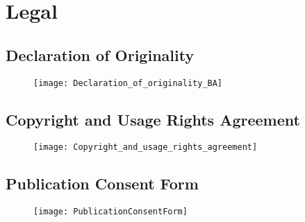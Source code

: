 \section{Legal}
\subsection{Declaration of Originality}
\begin{figure}[h!]
	\centering
	\texttt{[image: Declaration\_of\_originality\_BA]}
\end{figure}



\subsection{Copyright and Usage Rights Agreement}

\begin{figure}[h!]
	\centering
	\texttt{[image: Copyright\_and\_usage\_rights\_agreement]}
\end{figure}

\newpage
\subsection{Publication Consent Form}

\begin{figure}[h!]
	\centering
	\texttt{[image: PublicationConsentForm]}
\end{figure}